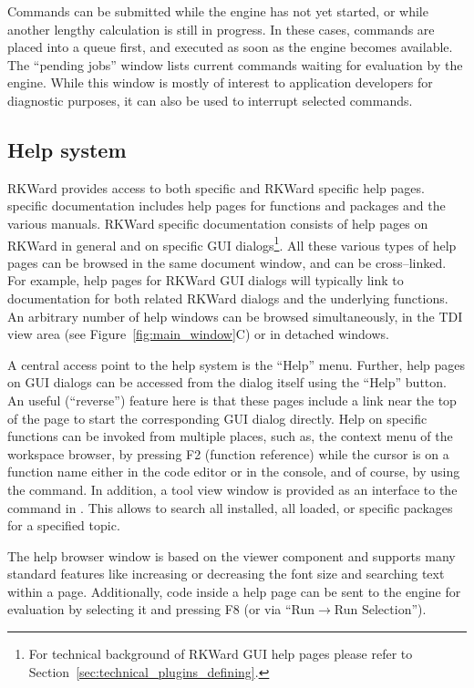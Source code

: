 Commands can be submitted while the  engine
has not yet started, or while another lengthy calculation is still
in progress. In these cases, commands are placed into a queue first, and
executed as soon as the  engine becomes
available. The ``pending jobs'' window lists current  commands waiting for
evaluation by the  engine. While this
window is mostly of interest to application developers for diagnostic
purposes, it can also be used to interrupt selected commands.

\subsection{Help system}
\label{sec:help_system}

RKWard provides access to both  specific and 
RKWard specific help pages.
 specific documentation includes help pages for functions and packages 
and the various  manuals. RKWard specific documentation consists of
help pages on RKWard in general and on specific GUI dialogs\footnote{For technical 
background of RKWard GUI help pages please refer to Section~\ref{sec:technical_plugins_defining}.}. 
All these various types of help pages can be browsed in the same document 
window, and can be cross--linked. For example, help pages for
RKWard GUI dialogs will typically link to documentation for both
related RKWard dialogs and the underlying  functions.
An arbitrary number of help windows can be browsed simultaneously, in the
TDI view area (see Figure~\ref{fig:main_window}C) or in detached windows.

A central access point to the help system is the ``Help'' menu. Further, help pages on
 GUI dialogs can be accessed from the dialog itself using the
``Help'' button. An useful (``reverse'') feature here is that these pages include 
a link near the top of the page to start the corresponding GUI dialog directly.
Help on  specific functions can be invoked from multiple places, 
such as, the context menu of the workspace browser, by pressing F2 (function
reference) while the cursor is on a function name either in the code editor or 
in the  console, and of course, by using the  
command. In addition, a tool view window is provided as an interface to the
 command in . This allows to search all installed, 
all loaded, or specific  packages for a specified topic.

The help browser window is based on the 
 viewer component and supports many standard
features like increasing or decreasing the font size and searching text
within a page. Additionally,  code inside a help
page can be sent to the  engine for
evaluation by selecting it and pressing F8 (or via ``Run$\rightarrow$Run
Selection'').
